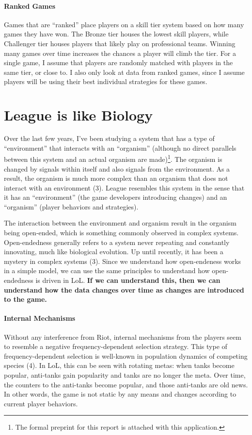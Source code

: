 \documentclass[twoside]{article}
\begin{document}
\begin{multicols}{2}
\paragraph{Ranked Games} Games that are ``ranked'' place players on a skill tier system based on how many games they have won. The Bronze tier houses the lowest skill players, while Challenger tier houses players that likely play on professional teams. Winning many games over time increases the chances a player will climb the tier. For a single game, I assume that players are randomly matched with players in the same tier, or close to. I also only look at data from ranked games, since I assume players will be using their best individual strategies for these games.



\section{League is like Biology} Over the last few years, I've been studying a system that has a type of ``environment'' that interacts with an ``organism'' (although no direct parallels between this system and an actual organism are made)\footnote{The formal preprint for this report is attached with this application.}. The organism is changed by signals within itself and also signals from the environment. As a result, the organism is much more complex than an organism that does not interact with an environment (3). League resembles this system in the sense that it has an ``environment'' (the game developers introducing changes) and an ``organism'' (player behaviors and strategies). 

The interaction between the environment and organism result in the organism being open-ended, which is something commonly observed in complex systems. Open-endedness generally refers to a system never repeating and constantly innovating, much like biological evolution. Up until recently, it has been a mystery in complex systems (3). Since we understand how open-endeness works in a simple model, we can use the same principles to understand how open-endedness is driven in LoL. \textbf{If we can understand this, then we can understand how the data changes over time as changes are introduced to the game.}

\paragraph{Internal Mechanisms} Without any interference from Riot, internal mechanisms from the players seem to resemble a negative frequency-dependent selection strategy.  This type of frequency-dependent selection is well-known in population dynamics of competing species (4). In LoL, this can be seen with rotating metas: when tanks become popular, anti-tanks gain popularity and tanks are no longer the meta. Over time, the counters to the anti-tanks become popular, and those anti-tanks are old news. In other words, the game is not static by any means and changes according to current player behaviors. 


\end{multicols}
\end{document}
